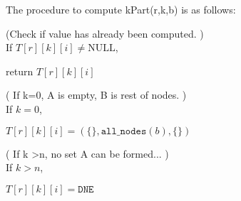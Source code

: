 \documentclass[11pt]{article}
\begin{document}
The procedure to compute kPart(r,k,b) is as follows:
\begin{indentmore}
    (Check if value has already been computed. )\\
    If $T[r][k][i] \neq \text{NULL}$,

       \begin{indentmore}
       return $T[r][k][i]$
       \end{indentmore}

    ( If k=0, A is empty, B is rest of nodes. )\\
    If $k = 0$,
       \begin{indentmore}
       $T[r][k][i] = (\{\}, {\mathtt{all\_nodes}(b)}, \{\})$
       \end{indentmore}

    ( If k \textgreater n, no set A can be formed... )\\
    If $k > n$,
       \begin{indentmore}
       $T[r][k][i] = \mathtt{DNE}$
       \end{indentmore}


\end{indentmore}
\end{document}
